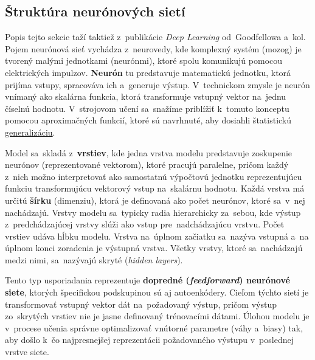 \subsection{Štruktúra neurónových sietí}
Popis tejto sekcie taží taktiež z~publikácie \textit{Deep Learning} od~Goodfellowa a~kol.~\cite{Goodfellow-et-al-2016} Pojem neurónová sieť vychádza z~neurovedy, kde komplexný systém (mozog) je tvorený malými jednotkami (neurónmi), ktoré spolu komunikujú pomocou elektrických impulzov. \textbf{Neurón} tu predstavuje matematickú jednotku, ktorá prijíma vstupy, spracováva ich a~generuje výstup. V~technickom zmysle je neurón vnímaný ako skalárna funkcia, ktorá transformuje vstupný vektor na~jednu číselnú hodnotu. V~strojovom učení sa~snažíme priblížiť k~tomuto konceptu pomocou aproximačných funkcií, ktoré sú navrhnuté, aby dosiahli štatistickú \hyperref[th:generalisation]{generalizáciu}. 

Model sa~skladá z~\textbf{vrstiev}, kde jedna vrstva modelu predstavuje zoskupenie neurónov (reprezentované vektorom), ktoré pracujú paralelne, pričom každý z~nich možno interpretovať ako samostatnú výpočtovú jednotku reprezentujúcu funkciu transformujúcu vektorový vstup na~skalárnu hodnotu. Každá vrstva má určitú \textbf{šírku} (dimenziu), ktorá je definovaná ako počet neurónov, ktoré sa~v~nej nachádzajú. Vrstvy modelu sa~typicky radia hierarchicky za~sebou, kde výstup z~predchádzajúcej vrstvy slúži ako vstup pre~nadchádzajúcu vrstvu. Počet vrstiev udáva hĺbku modelu. Vrstva na~úplnom začiatku sa~nazýva vstupná a~na úplnom konci zoradenia je výstupná vrstva. Všetky vrstvy, ktoré sa~nachádzajú medzi nimi, sa~nazývajú skryté (\textit{hidden layers}).

Tento typ usporiadania reprezentuje \textbf{dopredné (\textit{feedforward}) neurónové siete}\label{th:feedforward}, ktorých špecifickou podskupinou sú aj autoenkódery. Cieľom týchto sietí je transformovať vstupný vektor dát na~požadovaný výstup, pričom výstup zo~skrytých vrstiev nie je jasne definovaný trénovacími dátami. Úlohou modelu je v~procese učenia správne optimalizovať vnútorné parametre (váhy a~biasy) tak, aby došlo k~čo najpresnejšej reprezentácii požadovaného výstupu v~poslednej vrstve siete.

